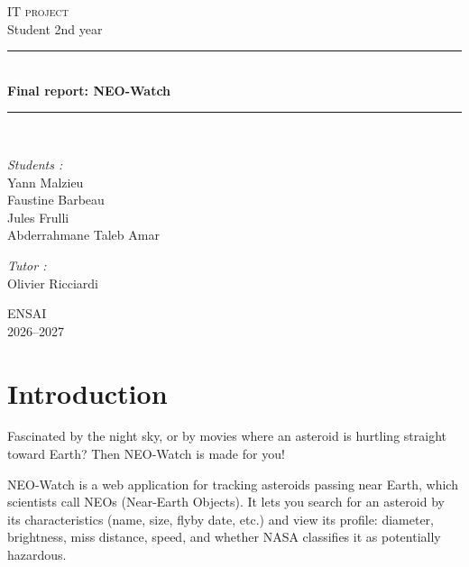 \documentclass[
  french,
  11pt,
  a4paper,
]{report}
\author{}
\date{}
\renewcommand*\contentsname{Table des matières}
\newcommand\contentsname{Table des matières}
\renewcommand*\listfigurename{Liste des Figures}
\newcommand\listfigurename{Liste des Figures}
\begin{document}
\begin{titlepage}
\centering


{\LARGE\textsc{IT project}}\\
\vspace{0.5cm}
{\large Student 2nd year}

\vspace{2.5cm}

\rule{\textwidth}{0.5mm}\\
\vspace{0.8cm}
{\huge\bfseries Final report: NEO-Watch}\\
\vspace{0.8cm}
\rule{\textwidth}{0.5mm}\\

\vspace{2.5cm}

\begin{flushleft}
\emph{Students :}\\
Yann Malzieu\\
Faustine Barbeau\\
Jules Frulli\\
Abderrahmane Taleb Amar\\
\end{flushleft}

\begin{flushright}
\emph{Tutor :}\\
Olivier Ricciardi\\
\vspace{1.0cm}
\end{flushright}

\vfill 
\begin{center}
ENSAI\\
2026--2027
\end{center}
\end{titlepage}

\renewcommand{\contentsname}{Table of content}
\tableofcontents

\renewcommand{\listfigurename}{List of figures}
\listoffigures

\chapter{Introduction}\label{introduction}

Fascinated by the night sky, or by movies where an asteroid is hurtling
straight toward Earth? Then NEO-Watch is made for you!

NEO-Watch is a web application for tracking asteroids passing near
Earth, which scientists call NEOs (Near-Earth Objects). It lets you
search for an asteroid by its characteristics (name, size, flyby date,
etc.) and view its profile: diameter, brightness, miss distance, speed,
and whether NASA classifies it as potentially hazardous.
\end{document}

